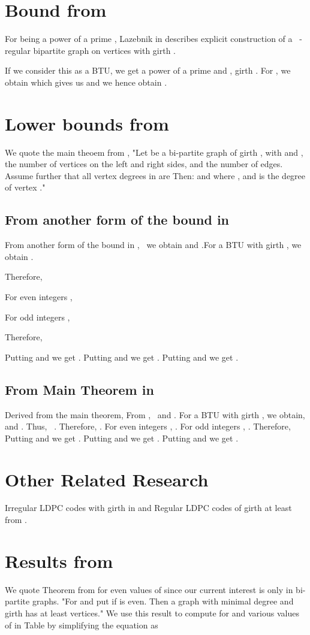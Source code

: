 \documentclass{llncs}
\begin{document}
\section {Bound from }
For  being a power of a prime  , Lazebnik in   describes explicit construction of a \   {}-regular bipartite graph on   vertices with girth  .

If we consider this as a  BTU, we get   a power of a prime and  , girth  . For  , we obtain   which gives us   and we hence obtain .

\section {Lower bounds from \ }
We quote the main theoem from , "Let  be a bi-partite graph of girth , with  and , the number of vertices on the left and right sides, and  the number of edges. Assume further that all vertex degrees in  are  Then:  and   where  ,   and  is the degree of vertex ."

\subsection {From another form of the bound in }
From another form of the bound in  , \ we obtain  and  .For a  BTU with girth  , we obtain  .

Therefore,   

For even integers  ,  

For odd integers   ,   

Therefore,   

Putting   and   we get  . 
Putting    and   we get  . 
Putting    and   we get   .

\subsection {From Main Theorem in }
Derived from the main theorem, 
From  , \   and   .
For a   BTU with girth   , we obtain,  and   .
Thus, \  .
Therefore,   .
For even integers   ,   .
For odd integers   ,   .
Therefore,   
Putting    and   we get   .
Putting    and   we get   .
Putting    and   we get   .

\section {Other Related Research}
Irregular LDPC codes with girth   in  and Regular LDPC codes of girth at least  from  .

\section {Results from }
We quote Theorem from  for even values of  since our current interest is only in bi-partite graphs. "For  and  put 
 if   is even. Then a graph  with minimal degree  and girth  has at least  vertices."
We use this result to compute  for  and various values of  in Table  by simplifying the equation as 
\end{document}
